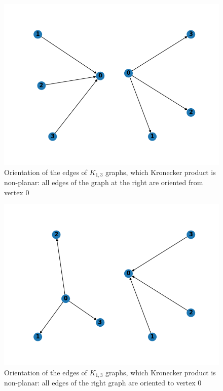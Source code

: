 \begin{figure}[h]

  \begin{center}  
  \includegraphics[scale = 0.3]{k13_0.png}
  \end{center}

  \caption{Orientation of the edges of $K_{1, 3}$ graphs, which Kronecker product is non-planar: all edges of the graph at the right are oriented from vertex $0$}

  \label{fig:k13_0}

\end{figure}


\begin{figure}[h]

  \begin{center}  
  \includegraphics[scale = 0.3]{k13_3.png}
  \end{center}

  \caption{Orientation of the edges of $K_{1, 3}$ graphs, which Kronecker product is non-planar: all edges of the right graph are oriented to vertex $0$}

  \label{fig:k13_3}

\end{figure}

